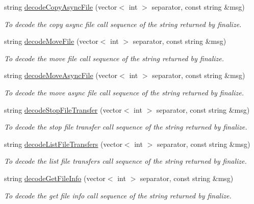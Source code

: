\begin{DoxyCompactItemize}
string \hyperlink{classFMSMapper_a2c2a380dcd117ee2e3a3f2d7a9d26c1e}{decodeCopyAsyncFile} (vector$<$ int $>$ separator, const string \&msg)
\begin{DoxyCompactList}\small\item\em To decode the copy async file call sequence of the string returned by finalize. \item\end{DoxyCompactList}\item 
string \hyperlink{classFMSMapper_a4e2c978c91a8aada03e88a565ebf530a}{decodeMoveFile} (vector$<$ int $>$ separator, const string \&msg)
\begin{DoxyCompactList}\small\item\em To decode the move file call sequence of the string returned by finalize. \item\end{DoxyCompactList}\item 
string \hyperlink{classFMSMapper_acdd0519e7632dd52443343857cded17b}{decodeMoveAsyncFile} (vector$<$ int $>$ separator, const string \&msg)
\begin{DoxyCompactList}\small\item\em To decode the move async file call sequence of the string returned by finalize. \item\end{DoxyCompactList}\item 
string \hyperlink{classFMSMapper_a11aaa9665f7e2e461ae2f436608f3a5b}{decodeStopFileTransfer} (vector$<$ int $>$ separator, const string \&msg)
\begin{DoxyCompactList}\small\item\em To decode the stop file transfer call sequence of the string returned by finalize. \item\end{DoxyCompactList}\item 
string \hyperlink{classFMSMapper_a02e93b7670aeac28693dfe87defff2be}{decodeListFileTransfers} (vector$<$ int $>$ separator, const string \&msg)
\begin{DoxyCompactList}\small\item\em To decode the list file transfers call sequence of the string returned by finalize. \item\end{DoxyCompactList}\item 
string \hyperlink{classFMSMapper_a854fac81447f774a084f56c7af3cca77}{decodeGetFileInfo} (vector$<$ int $>$ separator, const string \&msg)
\begin{DoxyCompactList}\small\item\em To decode the get file info call sequence of the string returned by finalize. \item\end{DoxyCompactList}\end{DoxyCompactItemize}


